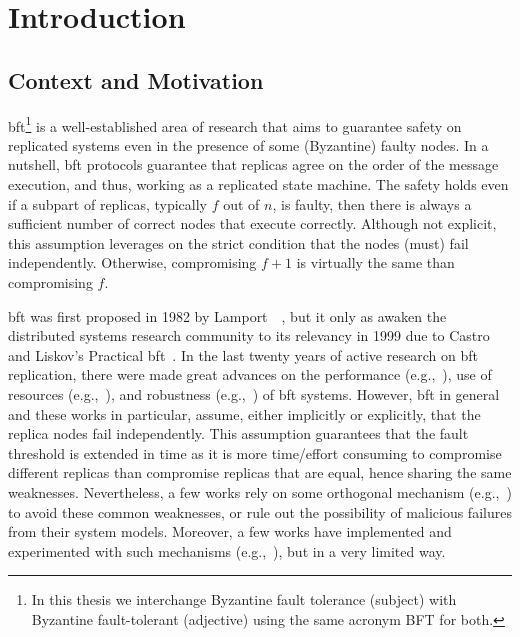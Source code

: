 \chapter{Introduction}
\label{chap:introduction}

\section{Context and Motivation}
\gls{bft}\footnote{In this thesis we interchange Byzantine fault tolerance (subject) with Byzantine fault-tolerant (adjective) using the same acronym BFT for both.} is a well-established area of research that aims to guarantee safety on replicated systems even in the presence of some (Byzantine) faulty nodes.
In a nutshell, \gls{bft} protocols guarantee that replicas agree on the order of the message execution, and thus, working as a replicated state machine.
The safety holds even if a subpart of replicas, typically $f$ out of $n$, is faulty, then there is always a sufficient number of correct nodes that execute correctly.
Although not explicit, this assumption leverages on the strict condition that the nodes (must) fail independently.
Otherwise, compromising $f+1$ is virtually the same than compromising $f$.


\gls{bft} was first proposed in 1982 by Lamport~\etal{}~\cite{Lamport:1982}, but it only as awaken the distributed systems research community to its relevancy in 1999 due to Castro and Liskov's Practical \gls{bft}~\cite{Castro:1999}. 
In the last twenty years of active research on \gls{bft} replication, there were made great advances on the performance (e.g.,~\cite{Kotla:2010,Aublin:2015,Behl:2015}), use of resources (e.g.,~\cite{Yin:2003,Wood:2011,Veronese:2013,Liu:2016,Behl:2017}), and robustness (e.g.,~\cite{Amir:2011,Bessani:2014,Clement:2009b}) of \gls{bft} systems.
However, \gls{bft} in general and these works in particular, assume, either implicitly or explicitly, that the replica nodes fail independently. 
This assumption guarantees that the fault threshold is extended in time as it is more time/effort consuming to compromise different replicas than compromise replicas that are equal, hence sharing the same weaknesses.
Nevertheless, a few works rely on some orthogonal mechanism (e.g.,~\cite{Roeder:2010,Chen:1995}) to avoid these common weaknesses, or rule out the possibility of malicious failures from their system models.
Moreover, a few works have implemented and experimented with such mechanisms (e.g.,~\cite{Rodrigues:2001,Roeder:2010,Amir:2011}), but in a very limited way.


